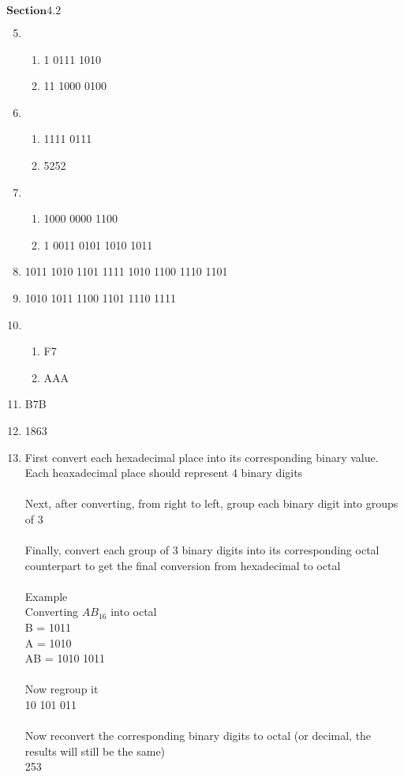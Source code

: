 \documentclass[12pt, letter paper]{article}
\begin{document}
$\mathbf{Section  4.2}$

\begin{enumerate}
	\setcounter{enumi}{4}
	\item
	\begin{enumerate}
		\item 1 0111 1010
		\item 11 1000 0100
	\end{enumerate}
	
	\item
	\begin{enumerate}
		\item 1111 0111
		\item 5252
	\end{enumerate}
	
	\item
	\begin{enumerate}
		\item 1000 0000 1100
		\item 1 0011 0101 1010 1011
	\end{enumerate}
	
	\item 1011 1010 1101 1111 1010 1100 1110 1101
	\\
	\item 1010 1011 1100 1101 1110 1111
	\\
	\item
	\begin{enumerate}
		\item F7
		\item AAA
	\end{enumerate}
	
	\item B7B
	\\
	\item 1863
	\\
	\setcounter{enumii}{17}
	
	\item First convert each hexadecimal place into its corresponding binary value. Each heaxadecimal place should represent 4 binary digits
	\\
	\\ Next, after converting, from right to left, group each binary digit into groups of 3
	\\
	\\ Finally, convert each group of 3 binary digits into its corresponding octal counterpart to get the final conversion from hexadecimal to octal
	\\
	\\ Example
	\\ Converting \(AB_{16}\) into octal
	\\ B = 1011
	\\A = 1010
	\\AB = 1010 1011
	\\
	\\Now regroup it
	\\  10 101 011
	\\
	\\Now reconvert the corresponding binary digits to octal (or decimal, the results will still be the same)
	\\ 253
	
	
	
\end{enumerate}
	

				
\end{document}
